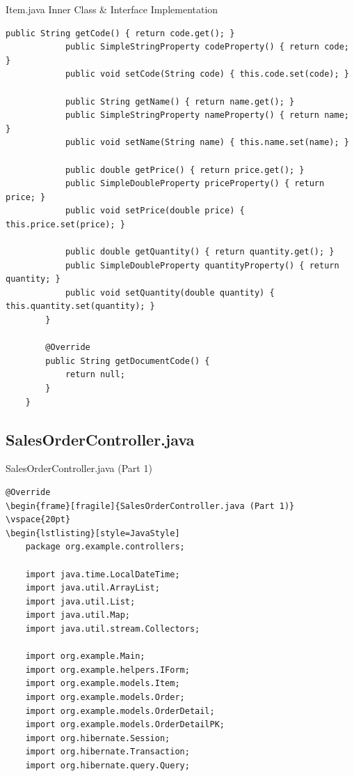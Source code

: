 \documentclass[aspectratio=169, table]{beamer}
\begin{document}
	\begin{frame}[fragile]{Item.java Inner Class \& Interface Implementation}
		\vspace{20pt}
		\begin{lstlisting}[style=JavaStyle]
			public String getCode() { return code.get(); }
			public SimpleStringProperty codeProperty() { return code; }
			public void setCode(String code) { this.code.set(code); }
			
			public String getName() { return name.get(); }
			public SimpleStringProperty nameProperty() { return name; }
			public void setName(String name) { this.name.set(name); }
			
			public double getPrice() { return price.get(); }
			public SimpleDoubleProperty priceProperty() { return price; }
			public void setPrice(double price) { this.price.set(price); }
			
			public double getQuantity() { return quantity.get(); }
			public SimpleDoubleProperty quantityProperty() { return quantity; }
			public void setQuantity(double quantity) { this.quantity.set(quantity); }
		}
		
		@Override
		public String getDocumentCode() {
			return null;
		}
	}
\end{lstlisting}
\end{frame}


\subsection{SalesOrderController.java}
\begin{frame}[fragile]{SalesOrderController.java (Part 1)}
\vspace{20pt}
\begin{lstlisting}[style=JavaStyle]
@Override
\begin{frame}[fragile]{SalesOrderController.java (Part 1)}
\vspace{20pt}
\begin{lstlisting}[style=JavaStyle]
	package org.example.controllers;
	
	import java.time.LocalDateTime;
	import java.util.ArrayList;
	import java.util.List;
	import java.util.Map;
	import java.util.stream.Collectors;
	
	import org.example.Main;
	import org.example.helpers.IForm;
	import org.example.models.Item;
	import org.example.models.Order;
	import org.example.models.OrderDetail;
	import org.example.models.OrderDetailPK;
	import org.hibernate.Session;
	import org.hibernate.Transaction;
	import org.hibernate.query.Query;
\end{lstlisting}
\end{frame}
\end{document}
